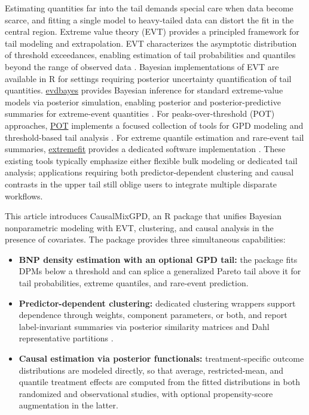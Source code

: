 \documentclass[article]{jss}\usepackage[]{graphicx}\usepackage[]{xcolor}
\DeclareRobustCommand{\pkg}[1]{\textsf{#1}}
\begin{document}
Estimating quantities far into the tail demands special care when data
become scarce, and fitting a single model to heavy-tailed data can
distort the fit in the central region.  Extreme value theory (EVT)
provides a principled framework for tail modeling and extrapolation.
EVT characterizes the asymptotic distribution of threshold
exceedances, enabling estimation of tail probabilities and quantiles
beyond the range of observed data
\citep{BalkemaDeHaan1974,Pickands1975,Coles2001}.  Bayesian
implementations of EVT are available in \textsf{R} for settings
requiring posterior uncertainty quantification of tail quantities.
\href{https://cran.r-project.org/package=evdbayes}{\textsf{evdbayes}}
provides Bayesian inference for standard extreme-value models via
posterior simulation, enabling posterior and posterior-predictive
summaries for extreme-event quantities \citep{evdbayes_pkg}.  For
peaks-over-threshold (POT) approaches,
\href{https://cran.r-project.org/package=POT}{\textsf{POT}} implements
a focused collection of tools for GPD modeling and threshold-based tail
analysis \citep{POT_pkg}.  For extreme quantile estimation and
rare-event tail summaries,
\href{https://cran.r-project.org/package=extremefit}{\textsf{extremefit}}
provides a dedicated software implementation
\citep{durrieu2018extremefit}.  These existing tools typically
emphasize either flexible bulk modeling or dedicated tail analysis;
applications requiring both predictor-dependent clustering and causal
contrasts in the upper tail still oblige users to integrate multiple
disparate workflows.

This article introduces \pkg{CausalMixGPD}, an \textsf{R} package
that unifies Bayesian nonparametric modeling with EVT, clustering, and
causal analysis in the presence of covariates.  The package provides
three simultaneous capabilities:

\begin{itemize}
  \item[(i)] \textbf{BNP density estimation with an optional GPD
  tail:} the package fits DPMs below a threshold and can splice a
  generalized Pareto tail above it for tail probabilities, extreme
  quantiles, and rare-event prediction.

  \item[(ii)] \textbf{Predictor-dependent clustering:} dedicated
  clustering wrappers support dependence through weights, component
  parameters, or both, and report label-invariant summaries via
  posterior similarity matrices and Dahl representative partitions
  \citep{Binder1978,Dahl2006}.

  \item[(iii)] \textbf{Causal estimation via posterior functionals:}
  treatment-specific outcome distributions are modeled directly, so
  that average, restricted-mean, and quantile treatment effects are
  computed from the fitted distributions in both randomized and
  observational studies, with optional propensity-score augmentation in
  the latter.
\end{itemize}
\end{document}
